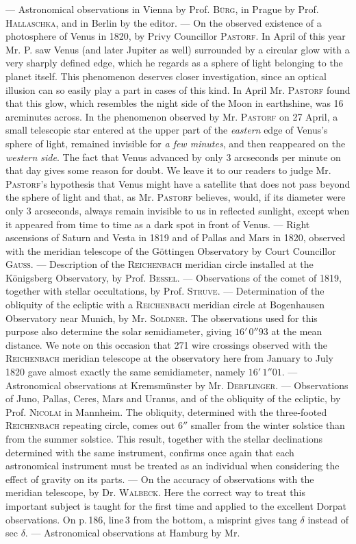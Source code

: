 --- Astronomical observations in Vienna by Prof. \textsc{Bürg}, in Prague by Prof. \textsc{Hallaschka}, and in Berlin by the editor. --- On the observed existence of a photosphere of Venus in 1820, by Privy Councillor \textsc{Pastorf}. In April of this year Mr. P. saw Venus (and later Jupiter as well) surrounded by a circular glow with a very sharply defined edge, which he regards as a sphere of light belonging to the planet itself. This phenomenon deserves closer investigation, since an optical illusion can so easily play a part in cases of this kind. In April Mr. \textsc{Pastorf} found that this glow, which resembles the night side of the Moon in earthshine, was 16 arcminutes across. In the phenomenon observed by Mr. \textsc{Pastorf} on 27 April, a small telescopic star entered at the upper part of the \emph{eastern} edge of Venus's sphere of light, remained invisible for \emph{a few minutes}, and then reappeared on the \emph{western side}. The fact that Venus advanced by only 3 arcseconds per minute on that day gives some reason for doubt. We leave it to our readers to judge Mr. \textsc{Pastorf}'s hypothesis that Venus might have a satellite that does not pass beyond the sphere of light and that, as Mr. \textsc{Pastorf} believes, would, if its diameter were only 3 arcseconds, always remain invisible to us in reflected sunlight, except when it appeared from time to time as a dark spot in front of Venus. --- Right ascensions of Saturn and Vesta in 1819 and of Pallas and Mars in 1820, observed with the meridian telescope of the Göttingen Observatory by Court Councillor \textsc{Gauss}. --- Description of the \textsc{Reichenbach} meridian circle installed at the Königsberg Observatory, by Prof. \textsc{Bessel}. --- Observations of the comet of 1819, together with stellar occultations, by Prof. \textsc{Struve}. --- Determination of the obliquity of the ecliptic with a \textsc{Reichenbach} meridian circle at Bogenhausen Observatory near Munich, by Mr. \textsc{Soldner}. The observations used for this purpose also determine the solar semidiameter, giving $16'\,0''93$ at the mean distance. We note on this occasion that 271 wire crossings observed with the \textsc{Reichenbach} meridian telescope at the observatory here from January to July 1820 gave almost exactly the same semidiameter, namely $16'\,1''01$. --- Astronomical observations at Kremsmünster by Mr. \textsc{Derflinger}. --- Observations of Juno, Pallas, Ceres, Mars and Uranus, and of the obliquity of the ecliptic, by Prof. \textsc{Nicolai} in Mannheim. The obliquity, determined with the three-footed \textsc{Reichenbach} repeating circle, comes out $6''$ smaller from the winter solstice than from the summer solstice. This result, together with the stellar declinations determined with the same instrument, confirms once again that each astronomical instrument must be treated as an individual when considering the effect of gravity on its parts. --- On the accuracy of observations with the meridian telescope, by Dr. \textsc{Walbeck}. Here the correct way to treat this  important subject is taught for the first time and applied to the excellent Dorpat observations. On p.\,186, line\,3 from the bottom, a misprint gives tang $\delta$ instead of sec $\delta$. --- Astronomical observations at Hamburg by Mr. 